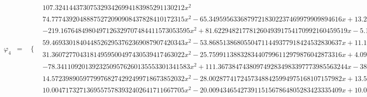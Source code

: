 \documentclass{article}
\begin{document}
\begin{landscape}
\begin{eqnarray*}
\begin{array}{cc}
\end{array}\\
\varphi_4 & = & \begin{array}{cc}
 \{ & 
\begin{array}{cc}
 107.3241443730753293426994183985291130212 x^2 & x\geq 0\land x<\frac{1}{8} \\
 74.77743920488875272090908437828410172315 x^2-65.34959563368797218302237469979909894616 x+13.27013371782232530374764319434498765547 & x\geq \frac{1}{4}\land x<\frac{3}{8} \\
 -219.1676484980497126329707484411573053595 x^2+81.62294821778126049391754170992160459519 x-5.101434263611328780869846356870100287199 & x\geq \frac{1}{8}\land x<\frac{1}{4} \\
 59.46933018404485262953762369087907420343 x^2-53.86851386805504711449377918424532830637 x+11.11743088676615185339853153517865566051 & x\geq \frac{3}{8}\land x<\frac{1}{2} \\
 31.36072770431814959500497430539417463022 x^2-25.75991138832834407996112979876042873316 x+4.090280266834476094765369188807430767205 & x\geq \frac{1}{2}\land x<\frac{5}{8} \\
 -78.34110920139232509576260135553301341583 x^2+111.3673847438097492834983397773985563244 x-38.76199977445867808131571505374225206328 & x\geq \frac{5}{8}\land x<\frac{3}{4} \\
 14.57239890597799768274292499718673852032 x^2-28.00287741724573488425994975168107157982 x+13.50184853593712848159364351966260840080 & x\geq \frac{3}{4}\land x<\frac{7}{8} \\
 10.00471732713695575783932402641711667705 x^2-20.00943465427391151567864805283423335409 x+10.00471732713695575783932402641711667705 & x\geq \frac{7}{8}\land x<1
\end{array}


\end{array}
\end{eqnarray*}
\end{landscape}
\end{document}
